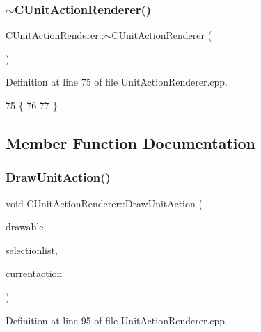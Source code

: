\subsubsection{\texorpdfstring{$\sim$\+C\+Unit\+Action\+Renderer()}{~CUnitActionRenderer()}}
{\footnotesize\ttfamily C\+Unit\+Action\+Renderer\+::$\sim$\+C\+Unit\+Action\+Renderer (\begin{DoxyParamCaption}{ }\end{DoxyParamCaption})}



Definition at line 75 of file Unit\+Action\+Renderer.\+cpp.


\begin{DoxyCode}
75                                          \{
76     
77 \}
\end{DoxyCode}


\subsection{Member Function Documentation}
\hypertarget{classCUnitActionRenderer_aef690a560f7dca2c2cf9051eb4f8d71f}{}\label{classCUnitActionRenderer_aef690a560f7dca2c2cf9051eb4f8d71f} 
\subsubsection{\texorpdfstring{Draw\+Unit\+Action()}{DrawUnitAction()}}
{\footnotesize\ttfamily void C\+Unit\+Action\+Renderer\+::\+Draw\+Unit\+Action (\begin{DoxyParamCaption}\item[{Gdk\+Drawable $\ast$}]{drawable,  }\item[{const std\+::list$<$ std\+::weak\+\_\+ptr$<$ \hyperlink{classCPlayerAsset}{C\+Player\+Asset} $>$ $>$ \&}]{selectionlist,  }\item[{\hyperlink{GameDataTypes_8h_a35b98ce26aca678b03c6f9f76e4778ce}{E\+Asset\+Capability\+Type}}]{currentaction }\end{DoxyParamCaption})}



Definition at line 95 of file Unit\+Action\+Renderer.\+cpp.


